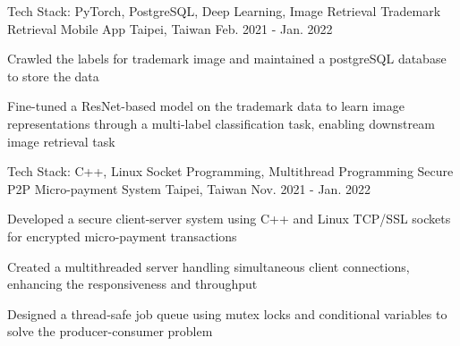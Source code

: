 \begin{cventries}
  \cventry
    {\color{awesome} Tech Stack: PyTorch, PostgreSQL, Deep Learning, Image Retrieval} %
    {Trademark Retrieval Mobile App}
    {Taipei, Taiwan} %
    {Feb. 2021 - Jan. 2022} %
    {
      \begin{cvitems} %
        \item {Crawled the labels for trademark image and maintained a postgreSQL database to store the data}
        \item {Fine-tuned a ResNet-based model on the trademark data to learn image representations through a multi-label classification task, enabling downstream image retrieval task}
      \end{cvitems}
    }

  \vspace{12pt}

  \cventry
    {\color{awesome} Tech Stack: C++, Linux Socket Programming, Multithread Programming} %
    {Secure P2P Micro-payment System}
    {Taipei, Taiwan} %
    {Nov. 2021 - Jan. 2022} %
    {
      \begin{cvitems} %
        \item {Developed a secure client-server system using C++ and Linux TCP/SSL sockets for encrypted micro-payment transactions}
        \item {Created a multithreaded server handling simultaneous client connections, enhancing the responsiveness and throughput}
        \item {Designed a thread-safe job queue using mutex locks and conditional variables to solve the producer-consumer problem}
      \end{cvitems}
    }

  \vspace{12pt}



\end{cventries}
